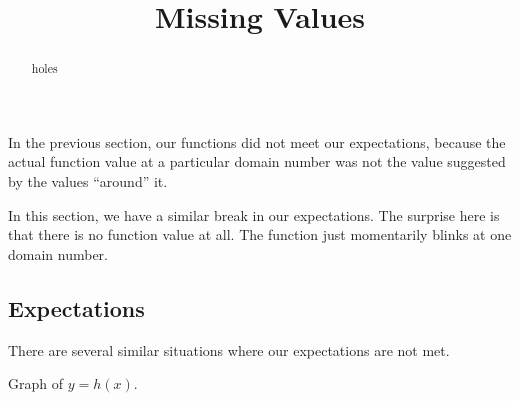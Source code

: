 \documentclass{ximera}
\title{Missing Values}
\begin{document}
\begin{abstract}
holes
\end{abstract}
\maketitle







In the previous section, our functions did not meet our expectations, because the actual function value at a particular domain number was not the value suggested by the values ``around'' it.



In this section, we have a similar break in our expectations. The surprise here is that there is no function value at all. The function just momentarily blinks at one domain number.



























\subsection{Expectations}

There are several similar situations where our expectations are not met.









Graph of $y = h(x)$.
\end{document}
